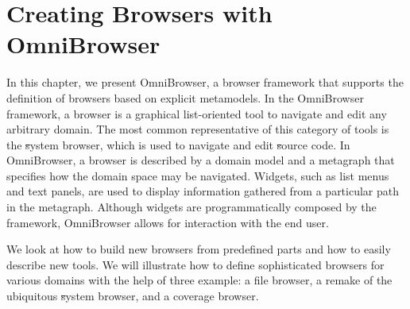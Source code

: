 \documentclass[a4paper,10pt,twoside]{book}
\begin{document}
	\sloppy
\fi

\newcommand{\ob}{Omni\-Brow\-ser\xspace}
\newcommand{\obf}{Omni\-Brow\-ser framework\xspace}
\newcommand{\applflab}{ApplFLab\xspace}



\chapter{Creating Browsers with OmniBrowser}


\noindent
In this chapter, we present \ob, a browser framework that supports the definition of browsers based on explicit metamodels. In the \obf, a browser is a graphical list-oriented tool to navigate and edit any arbitrary domain. The most common representative of this category of tools is the \st system browser, which is used to navigate and edit \st source code.
In \ob, a browser is described by a domain model and a metagraph that specifies how the domain space may be navigated. Widgets, such as list menus and text panels, are used to display information gathered from a particular path in the metagraph. Although widgets are programmatically composed by the framework, \ob allows for interaction with the end user.

We look at how to build new browsers from predefined parts and how to easily describe new tools. We will illustrate how to define sophisticated browsers for various domains with the help of three example: a file browser, a remake of the ubiquitous \st system browser, and a coverage browser.

\end{document}

